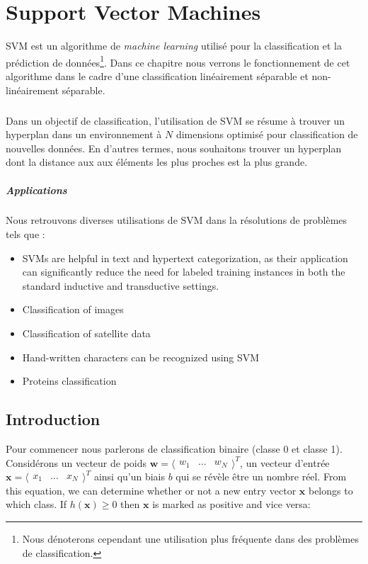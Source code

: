 \chapter{Support Vector Machines}

\gls{SVM} est un algorithme de \textit{machine learning} utilisé pour la classification et la prédiction de données\footnote{Nous dénoterons cependant une utilisation plus fréquente dans des problèmes de classification.}.
Dans ce chapitre nous verrons le fonctionnement de cet algorithme dans le cadre d'une classification linéairement séparable et non-linéairement séparable.

\paragraph{}

Dans un objectif de classification, l'utilisation de \gls{SVM} se résume à trouver un hyperplan dans un environnement à $N$ dimensions optimisé pour classification de nouvelles données.
En d'autres termes, nous souhaitons trouver un hyperplan dont la distance aux aux éléments les plus proches est la plus grande.

\paragraph{Applications}
Nous retrouvons diverses utilisations de \gls{SVM} dans la résolutions de problèmes tels que : 
\begin{itemize}
	\item \gls{SVM}s are helpful in text and hypertext categorization, as their application can significantly reduce the need for labeled training instances in both the standard inductive and transductive settings.
	\item Classification of images
	\item Classification of satellite data
	\item Hand-written characters can be recognized using SVM
	\item Proteins classification
\end{itemize}

\section{Introduction}

Pour commencer nous parlerons de classification binaire (classe 0 et classe 1). Considérons un vecteur de poids $\mathbf w = \langle \begin{matrix} w_1 & \dots & w_N \end{matrix} \rangle^T$, un vecteur d'entrée $\mathbf x = \langle \begin{matrix} x_1 & \dots & x_N \end{matrix} \rangle^T$ ainsi qu'un biais $b$ qui se révèle être un nombre réel.
From this equation, we can determine whether or not a new entry vector $\mathbf x$ belongs to which class.
If $h(\mathbf x) \geq 0$ then $\mathbf x$ is marked as positive and vice versa:


